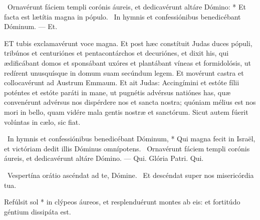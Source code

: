 \R\ Ornavérunt fáciem templi corónis áureis, et dedicavérunt altáre Dómino: * Et facta est lætítia magna in pópulo. \V\ In hymnis et confessiónibus benedicébant Dóminum. — Et.



\lettrine[lines=2]{E}{T} tubis exclamavérunt voce magna. Et post hæc constítuit Judas duces pópuli, tribúnos et centuriónes et pentacontárchos et decuriónes, et dixit his, qui ædificábant domos et sponsábant uxóres et plantábant víneas et formidolósis, ut redírent unusquísque in domum suam secúndum legem. Et movérunt castra et collocavérunt ad Austrum Emmaum. Et ait Judas: Accingímini et estóte fílii poténtes et estóte paráti in mane, ut pugnétis advérsus natiónes has, quæ convenérunt advérsus nos dispérdere nos et sancta nostra; quóniam mélius est nos mori in bello, quam vidére mala gentis nostræ et sanctórum. Sicut autem fúerit volúntas in cælo, sic fiat.

\R\ In hymnis et confessiónibus benedicébant Dóminum, * Qui magna fecit in Israël, et victóriam dedit illis Dóminus omnípotens. \V\ Ornavérunt fáciem templi corónis áureis, et dedicavérunt altáre Dómino. — Qui. Glória Patri. Qui.


\V\ Vespertína orátio ascéndat ad te, Dómine. \R\ Et descéndat super nos misericórdia tua.

 Refúlsit sol * in clýpeos áureos, et resplenduérunt montes ab eis: et fortitúdo géntium dissipáta est.



